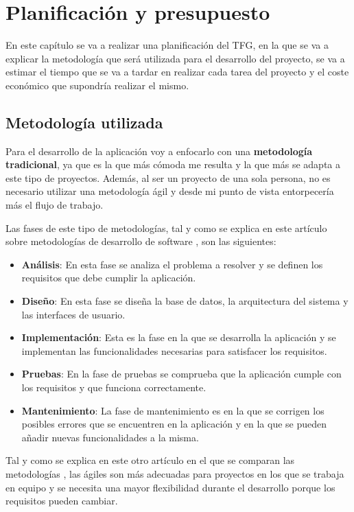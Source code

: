 \chapter{Planificación y presupuesto}
En este capítulo se va a realizar una planificación del TFG, en la que se
va a explicar la metodología que será utilizada para el desarrollo del proyecto,
se va a estimar el tiempo que se va a tardar en realizar cada tarea del proyecto
y el coste económico que supondría realizar el mismo.

\section{Metodología utilizada}
Para el desarrollo de la aplicación voy a enfocarlo con una \textbf{metodología
tradicional}, ya que es la que más cómoda me resulta y la que más se adapta
a este tipo de proyectos. Además, al ser un proyecto de una sola persona, no es
necesario utilizar una metodología ágil y desde mi punto de vista entorpecería
más el flujo de trabajo.

Las fases de este tipo de metodologías, tal y como se explica en este artículo
sobre metodologías de desarrollo de software \cite{metodologias}, son las siguientes:

\begin{itemize}
  \item \textbf{Análisis}: En esta fase se analiza el problema a resolver y se
  definen los requisitos que debe cumplir la aplicación.
  \item \textbf{Diseño}: En esta fase se diseña la base de datos, la arquitectura
  del sistema y las interfaces de usuario.
  \item \textbf{Implementación}: Esta es la fase en la que se desarrolla la
  aplicación y se implementan las funcionalidades necesarias para satisfacer
  los requisitos.
  \item \textbf{Pruebas}: En la fase de pruebas se comprueba que la aplicación
  cumple con los requisitos y que funciona correctamente.
  \item \textbf{Mantenimiento}: La fase de mantenimiento es en la que se corrigen
  los posibles errores que se encuentren en la aplicación y en la que se pueden
  añadir nuevas funcionalidades a la misma.
\end{itemize}

Tal y como se explica en este otro artículo en el que se comparan las metodologías
\cite{tradicionalesVSagiles}, las ágiles son más adecuadas para proyectos
en los que se trabaja en equipo y se necesita una mayor flexibilidad durante el
desarrollo porque los requisitos pueden cambiar.

